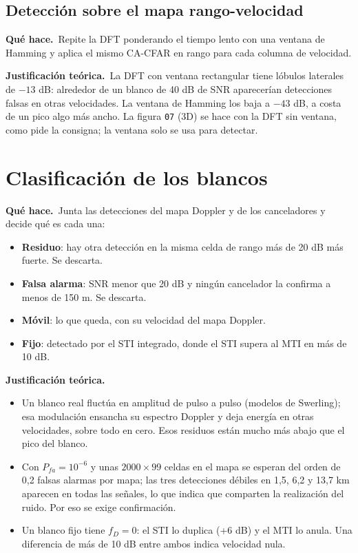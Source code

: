 \documentclass[11pt]{article}
\newcommand{\codigo}[2]{}
\newcommand{\teoria}{\par\textcolor{verde}{\textbf{Justificación teórica.}}\ }
\newcommand{\hace}{\par\textcolor{verde}{\textbf{Qué hace.}}\ }
\newcommand{\archivo}[1]{\texttt{#1}}
\begin{document}
\subsection{Detección sobre el mapa rango-velocidad}
\codigo{251}{256}
\hace Repite la DFT ponderando el tiempo lento con una ventana de Hamming y aplica el mismo CA-CFAR en rango para cada columna de velocidad.

\teoria La DFT con ventana rectangular tiene lóbulos laterales de $-13$ dB: alrededor de un blanco de 40 dB de SNR aparecerían detecciones falsas en otras velocidades. La ventana de Hamming los baja a $-43$ dB, a costa de un pico algo más ancho. La figura \archivo{07} (3D) se hace con la DFT sin ventana, como pide la consigna; la ventana solo se usa para detectar.

\section{Clasificación de los blancos}
\codigo{276}{293}
\hace Junta las detecciones del mapa Doppler y de los canceladores y decide qué es cada una:
\begin{itemize}
  \item \textbf{Residuo}: hay otra detección en la misma celda de rango más de 20 dB más fuerte. Se descarta.
  \item \textbf{Falsa alarma}: SNR menor que 20 dB y ningún cancelador la confirma a menos de 150 m. Se descarta.
  \item \textbf{Móvil}: lo que queda, con su velocidad del mapa Doppler.
  \item \textbf{Fijo}: detectado por el STI integrado, donde el STI supera al MTI en más de 10 dB.
\end{itemize}

\teoria
\begin{itemize}
  \item Un blanco real fluctúa en amplitud de pulso a pulso (modelos de Swerling); esa modulación ensancha su espectro Doppler y deja energía en otras velocidades, sobre todo en cero. Esos residuos están mucho más abajo que el pico del blanco.
  \item Con $P_{fa} = 10^{-6}$ y unas $2000 \times 99$ celdas en el mapa se esperan del orden de 0,2 falsas alarmas por mapa; las tres detecciones débiles en 1,5, 6,2 y 13,7 km aparecen en todas las señales, lo que indica que comparten la realización del ruido. Por eso se exige confirmación.
  \item Un blanco fijo tiene $f_D = 0$: el STI lo duplica (+6 dB) y el MTI lo anula. Una diferencia de más de 10 dB entre ambos indica velocidad nula.
\end{itemize}
\end{document}
